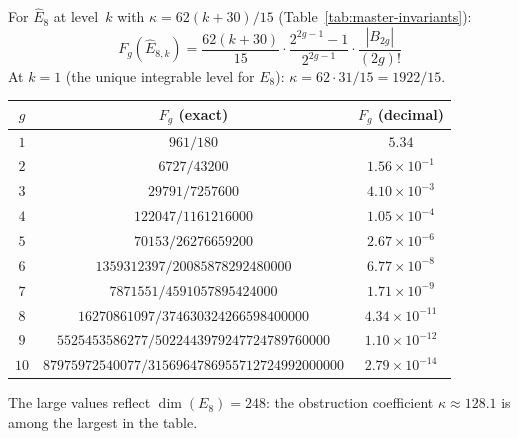 \begin{computation}\label{comp:e8-genus-expansion}
For $\widehat{E}_8$ at level~$k$ with $\kappa = 62(k+30)/15$ (Table~\ref{tab:master-invariants}):
\begin{equation}\label{eq:e8-Fg}
F_g(\widehat{E}_{8,k}) = \frac{62(k+30)}{15} \cdot \frac{2^{2g-1}-1}{2^{2g-1}} \cdot \frac{|B_{2g}|}{(2g)!}
\end{equation}
At $k = 1$ (the unique integrable level for $E_8$): $\kappa = 62 \cdot 31/15 = 1922/15$.
\begin{center}
\renewcommand{\arraystretch}{1.3}
\begin{tabular}{ccc}
\toprule
$g$ & $F_g$ (exact) & $F_g$ (decimal) \\
\midrule
$1$ & $961/180$ & $5.34$ \\
$2$ & $6727/43200$ & $1.56 \times 10^{-1}$ \\
$3$ & $29791/7257600$ & $4.10 \times 10^{-3}$ \\
$4$ & $122047/1161216000$ & $1.05 \times 10^{-4}$ \\
$5$ & $70153/26276659200$ & $2.67 \times 10^{-6}$ \\
$6$ & $1359312397/20085878292480000$ & $6.77 \times 10^{-8}$ \\
$7$ & $7871551/4591057895424000$ & $1.71 \times 10^{-9}$ \\
$8$ & $16270861097/374630324266598400000$ & $4.34 \times 10^{-11}$ \\
$9$ & $5525453586277/5022443979247724789760000$ & $1.10 \times 10^{-12}$ \\
$10$ & $87975972540077/3156964786955712724992000000$ & $2.79 \times 10^{-14}$ \\
\bottomrule
\end{tabular}
\end{center}
The large values reflect $\dim(E_8) = 248$: the obstruction coefficient $\kappa \approx 128.1$ is among the largest in the table.
\end{computation}

